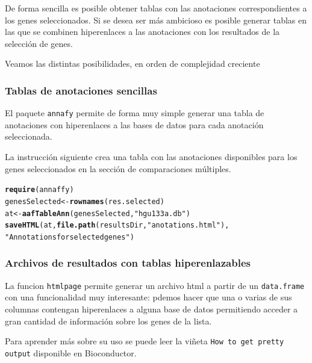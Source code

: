 \documentclass[a4paper]{article}\usepackage[]{graphicx}\usepackage[]{color}
\makeatletter
\newcommand{\hlstr}[1]{\textcolor[rgb]{0.192,0.494,0.8}{#1}}%
\newcommand{\hlstd}[1]{\textcolor[rgb]{0.345,0.345,0.345}{#1}}%
\newcommand{\hlkwb}[1]{\textcolor[rgb]{0.69,0.353,0.396}{#1}}%
\newcommand{\hlkwd}[1]{\textcolor[rgb]{0.737,0.353,0.396}{\textbf{#1}}}%
\newenvironment{kframe}{%
 \def\at@end@of@kframe{}%
 \ifinner\ifhmode%
  \def\at@end@of@kframe{\end{minipage}}%
  \begin{minipage}{\columnwidth}%
 \fi\fi%
 \def\FrameCommand##1{\hskip\@totalleftmargin \hskip-\fboxsep
 \colorbox{shadecolor}{##1}\hskip-\fboxsep
     \hskip-\linewidth \hskip-\@totalleftmargin \hskip\columnwidth}%
 \MakeFramed {\advance\hsize-\width
   \@totalleftmargin\z@ \linewidth\hsize
   \@setminipage}}%
 {\par\unskip\endMakeFramed%
 \at@end@of@kframe}
\newenvironment{knitrout}{}{} %
\newcommand{\Rfun}[1]{{\texttt{#1}}}
\makeatother
\begin{document}
De forma sencilla es posible obtener tablas con las anotaciones correspondientes a los genes seleccionados. Si se desea ser más ambicioso es posible generar tablas en las que se combinen hiperenlaces a las anotaciones con los resultados de la selección de genes.

Veamos las distintas posibilidades, en orden de complejidad creciente

\subsubsection{Tablas de anotaciones sencillas}

El paquete \texttt{annafy} permite de forma muy simple generar una tabla de anotaciones con hiperenlaces a las bases de datos para cada anotación seleccionada.

La instrucción siguiente crea una tabla con las anotaciones disponibles para los genes seleccionados en la sección de comparaciones múltiples.

\begin{knitrout}
\color{fgcolor}\begin{kframe}
\begin{alltt}
\hlkwd{require}\hlstd{(annaffy)}
\hlstd{genesSelected} \hlkwb{<-} \hlkwd{rownames}\hlstd{(res.selected)}
\hlstd{at} \hlkwb{<-} \hlkwd{aafTableAnn}\hlstd{(genesSelected,} \hlstr{"hgu133a.db"}\hlstd{)}
\hlkwd{saveHTML} \hlstd{(at,} \hlkwd{file.path}\hlstd{(resultsDir,} \hlstr{"anotations.html"}\hlstd{),}
          \hlstr{"Annotations for selected genes"}\hlstd{)}
\end{alltt}
\end{kframe}
\end{knitrout}


\subsubsection{Archivos de resultados con tablas hiperenlazables}

La funcion \Rfun{htmlpage} permite generar un archivo html a partir de un \Rfun{data.frame} con una funcionalidad muy interesante: pdemos hacer que una o varias de sus columnas contengan hiperenlaces a alguna base de datos permitiendo acceder a gran cantidad de información sobre los genes de la lista.

Para aprender más sobre su uso se puede leer la viñeta \texttt{How to get pretty output} disponible en Bioconductor.
\end{document}

